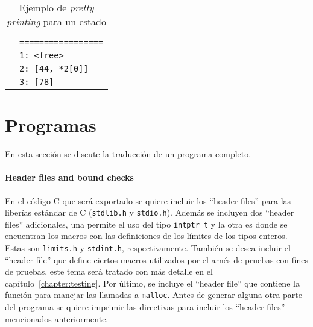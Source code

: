 \begin{table}[h!]
\begin{tabular}{|l|l|}
                                                                                                               & \verb|=================| \\
                                                                                                               & \verb|1: <free>| \\
                                                                                                               & \verb|2: [44, *2[0]]| \\
                                                                                                               & \verb|3: [78]| \\
  \hline
\end{tabular}

\caption{Ejemplo de \textit{pretty printing} para un estado}
\label{tab:pretty_simp_state}
\end{table}


\section{Programas}

En esta sección se discute la traducción de un programa completo.

\paragraph*{Header files and bound checks}

En el código C que será exportado se quiere incluir los ``header files'' para las liberías estándar de C (\verb|stdlib.h| y \verb|stdio.h|).
Además se incluyen dos ``header files'' adicionales, una permite el uso del tipo \verb|intptr_t| y la otra es donde se encuentran los macros con las definiciones de los límites de los tipos enteros.
Estas son \verb|limits.h| y \verb|stdint.h|, respectivamente.
También se desea incluir el ``header file'' que define ciertos macros utilizados por el arnés de pruebas con fines de pruebas, este tema será tratado con más detalle en el capítulo~\ref{chapter:testing}.
Por último, se incluye el ``header file'' que contiene la función para manejar las llamadas a \verb|malloc|.
Antes de generar alguna otra parte del programa se quiere imprimir las directivas para incluir los ``header files'' mencionados anteriormente.


